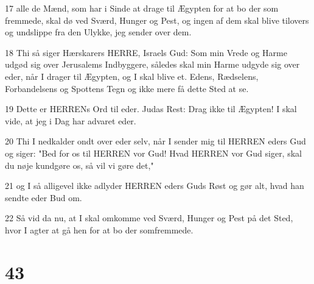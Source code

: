 \par 17 alle de Mænd, som har i Sinde at drage til Ægypten for at bo der som fremmede, skal dø ved Sværd, Hunger og Pest, og ingen af dem skal blive tilovers og undslippe fra den Ulykke, jeg sender over dem.
\par 18 Thi så siger Hærskarers HERRE, Israels Gud: Som min Vrede og Harme udgød sig over Jerusalems Indbyggere, således skal min Harme udgyde sig over eder, når I drager til Ægypten, og I skal blive et. Edens, Rædselens, Forbandelsens og Spottens Tegn og ikke mere få dette Sted at se.
\par 19 Dette er HERRENs Ord til eder. Judas Rest: Drag ikke til Ægypten! I skal vide, at jeg i Dag har advaret eder.
\par 20 Thi I nedkalder ondt over eder selv, når I sender mig til HERREN eders Gud og siger: "Bed for os til HERREN vor Gud! Hvad HERREN vor Gud siger, skal du nøje kundgøre os, så vil vi gøre det,"
\par 21 og I så alligevel ikke adlyder HERREN eders Guds Røst og gør alt, hvad han sendte eder Bud om.
\par 22 Så vid da nu, at I skal omkomme ved Sværd, Hunger og Pest på det Sted, hvor I agter at gå hen for at bo der somfremmede.

\chapter{43}

